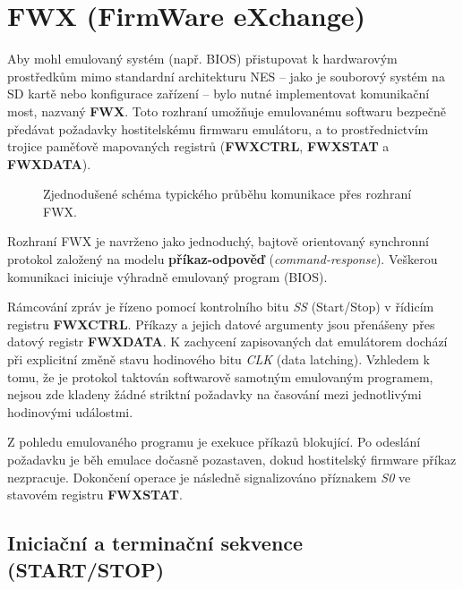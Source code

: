 \label{pp:fwx}
\section{FWX (FirmWare eXchange)}


Aby mohl emulovaný systém (např. BIOS) přistupovat k hardwarovým prostředkům mimo standardní
architekturu NES -- jako je souborový systém na SD kartě nebo konfigurace zařízení -- bylo nutné
implementovat komunikační most, nazvaný \textbf{FWX}. Toto rozhraní umožňuje emulovanému softwaru
bezpečně předávat požadavky hostitelskému firmwaru emulátoru, a to prostřednictvím trojice paměťově
mapovaných registrů (\textbf{FWXCTRL}, \textbf{FWXSTAT} a \textbf{FWXDATA}).

\begin{figure}[htbp]
    \centering
    
    \caption{Zjednodušené schéma typického průběhu komunikace přes rozhraní FWX.}
    \label{fig:simplified_typical_communication}
\end{figure}

Rozhraní FWX je navrženo jako jednoduchý, bajtově orientovaný synchronní protokol založený na modelu
\textbf{příkaz-odpověď} (\textit{command-response}). Veškerou komunikaci iniciuje výhradně emulovaný
program (BIOS).

Rámcování zpráv je řízeno pomocí kontrolního bitu \emph{SS} (Start/Stop) v řídicím registru
\textbf{FWXCTRL}. Příkazy a jejich datové argumenty jsou přenášeny přes datový registr
\textbf{FWXDATA}. K zachycení zapisovaných dat emulátorem dochází při explicitní změně stavu
hodinového bitu \emph{CLK} (data latching). Vzhledem k tomu, že je protokol taktován softwarově
samotným emulovaným programem, nejsou zde kladeny žádné striktní požadavky na časování mezi
jednotlivými hodinovými událostmi.

Z pohledu emulovaného programu je exekuce příkazů blokující. Po odeslání požadavku je běh
emulace dočasně pozastaven, dokud hostitelský firmware příkaz nezpracuje. Dokončení operace je
následně signalizováno příznakem \emph{S0} ve stavovém registru \textbf{FWXSTAT}.

\subsection{Iniciační a terminační sekvence (START/STOP)}

